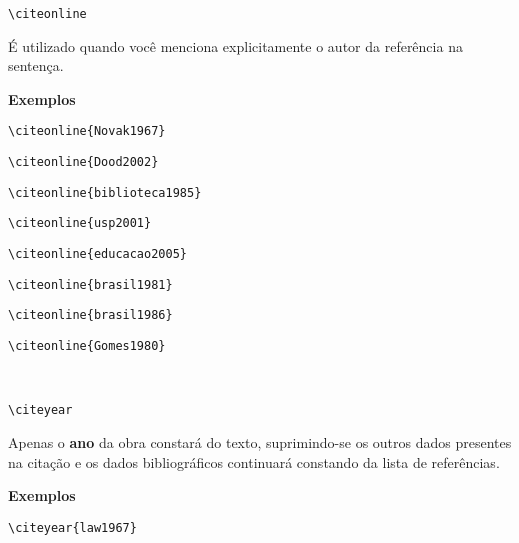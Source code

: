 \begin{alineas}
\item
\begin{verbatim}
\citeonline
\end{verbatim}

É utilizado quando você menciona explicitamente o autor da referência na sentença.

\textbf{Exemplos}

\begin{verbatim}
\citeonline{Novak1967}
\end{verbatim}

\begin{verbatim}
\citeonline{Dood2002}
\end{verbatim}

\begin{verbatim}
\citeonline{biblioteca1985}
\end{verbatim}

\begin{verbatim}
\citeonline{usp2001}
\end{verbatim}

\begin{verbatim}
\citeonline{educacao2005}
\end{verbatim}

\begin{verbatim}
\citeonline{brasil1981}
\end{verbatim}

\begin{verbatim}
\citeonline{brasil1986}
\end{verbatim}

\begin{verbatim}
\citeonline{Gomes1980}
\end{verbatim}
\\

\item
\begin{verbatim}
\citeyear
\end{verbatim}

Apenas o \textbf{ano} da obra constará do texto, suprimindo-se os outros dados presentes na citação e os dados bibliográficos continuará constando da lista de referências. 

\textbf{Exemplos}

\begin{verbatim}
\citeyear{law1967}
\end{verbatim}
\citeyear{law1967}


\end{alineas}
